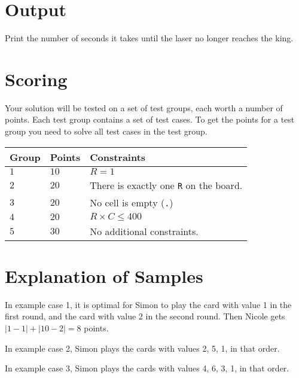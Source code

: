 \section*{Output}
Print the number of seconds it takes until the laser no longer reaches the king.

\section*{Scoring}
Your solution will be tested on a set of test groups, each worth a number of points. Each test group contains
a set of test cases. To get the points for a test group you need to solve all test cases in the test group.

\noindent
\begin{tabular}{| l | l | l |}
  \hline
  \textbf{Group} & \textbf{Points} & \textbf{Constraints} \\ \hline
  $1$    & $10$       &  $R=1$ \\ \hline
  $2$    & $20$       &  There is exactly one \texttt{R} on the board. \\ \hline
  $3$    & $20$       &  No cell is empty (\texttt{.}) \\ \hline
  $4$    & $20$       &  $R\times C \leq 400$ \\ \hline
  $5$    & $30$       & No additional constraints. \\ \hline
\end{tabular}

\section*{Explanation of Samples}
In example case 1, it is optimal for Simon to play the card with value 1 in the first round, and the card with value 2 in the second round. Then Nicole gets $|1-1| + |10-2| = 8$ points.

In example case 2, Simon plays the cards with values 2, 5, 1, in that order.

In example case 3, Simon plays the cards with values 4, 6, 3, 1, in that order.
